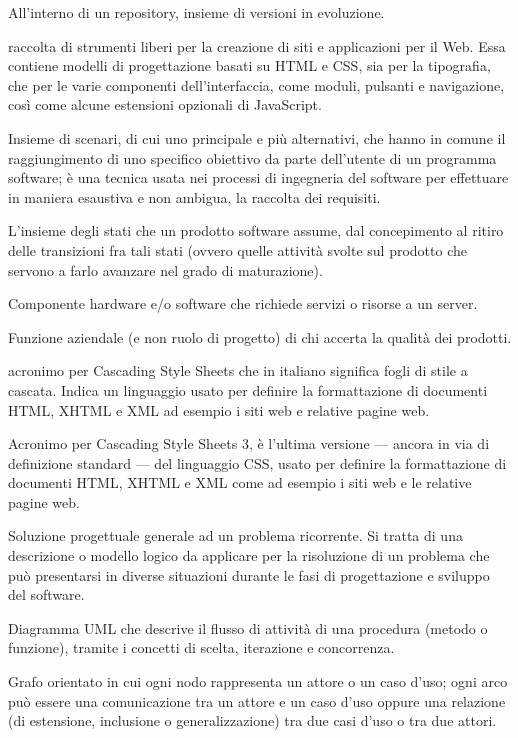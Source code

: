 \item[branch] All'interno di un repository, insieme di versioni in evoluzione.
\item[Bootstrap] raccolta di strumenti liberi per la creazione di siti e applicazioni per il Web. Essa contiene modelli di progettazione basati su HTML e CSS, sia per la tipografia, che per le varie componenti dell'interfaccia, come moduli, pulsanti e navigazione, così come alcune estensioni opzionali di JavaScript.
\item[caso d'uso] Insieme di scenari, di cui uno principale e più alternativi, che hanno in comune il raggiungimento di uno specifico obiettivo da parte dell'utente di un programma software; è una tecnica usata nei processi di ingegneria del software per effettuare in maniera esaustiva e non ambigua, la raccolta dei requisiti.
\item[ciclo di vita (di un prodotto)] L'insieme degli stati che un prodotto software assume, dal concepimento al ritiro delle transizioni fra tali stati (ovvero quelle attività svolte sul prodotto che servono a farlo avanzare nel grado di maturazione).
\item[client] Componente hardware e/o software che richiede servizi o risorse a un server.
\item[Controllore della qualità] Funzione aziendale (e non ruolo di progetto) di chi accerta la qualità dei prodotti.
\item[CSS] acronimo per Cascading Style Sheets che in italiano significa fogli di stile a cascata. Indica un linguaggio usato per definire la formattazione di documenti HTML, XHTML e XML ad esempio i siti web e relative pagine web.
\item[CSS3] Acronimo per Cascading Style Sheets 3, è l'ultima versione --- ancora in via di definizione standard --- del linguaggio CSS, usato per definire la formattazione di documenti HTML, XHTML e XML come ad esempio i siti web e le relative pagine web.
\item[design pattern] Soluzione progettuale generale ad un problema ricorrente. Si tratta di una descrizione o modello logico da applicare per la risoluzione di un problema che può presentarsi in diverse situazioni durante le fasi di progettazione e sviluppo del software.
\item[diagramma delle attività] Diagramma UML che descrive il flusso di attività di una procedura (metodo o funzione), tramite i concetti di scelta, iterazione e concorrenza.
\item[diagramma dei casi d'uso] Grafo orientato in cui ogni nodo rappresenta un attore o un caso d'uso; ogni arco può essere una comunicazione tra un attore e un caso d'uso oppure una relazione (di estensione, inclusione o generalizzazione) tra due casi d'uso o tra due attori.
